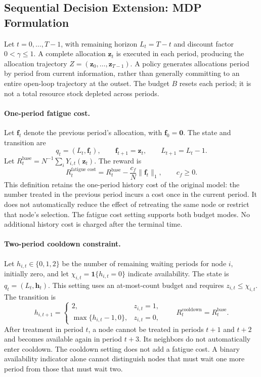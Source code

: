 \documentclass[a4paper,11pt]{article}
\newcommand{\ind}{\mathbf 1}
\numberwithin{equation}{section}
\begin{document}
\subsection{Sequential Decision Extension: MDP Formulation}
\label{sec:mdp}
Let $t=0,\ldots,T-1$, with remaining horizon $L_t=T-t$ and discount factor $0<\gamma\leq1$. A complete allocation $\mathbf z_t$ is executed in each period, producing the allocation trajectory $Z=(\mathbf z_0,\ldots,\mathbf z_{T-1})$. A policy generates allocations period by period from current information, rather than generally committing to an entire open-loop trajectory at the outset. The budget $B$ resets each period; it is not a total resource stock depleted across periods.

\paragraph{One-period fatigue cost.}
Let $\mathbf f_t$ denote the previous period's allocation, with $\mathbf f_0=\mathbf0$. The state and transition are
\begin{equation}
q_t=(L_t,\mathbf f_t),\qquad
\mathbf f_{t+1}=\mathbf z_t,\qquad L_{t+1}=L_t-1.
\end{equation}
Let $R_t^{\mathrm{base}}=N^{-1}\sum_iY_{i,t}(\mathbf z_t)$. The reward is
\begin{equation}
R_t^{\text{fatigue cost}}=R_t^{\mathrm{base}}-\frac{c_f}{N}\|\mathbf f_t\|_1,\qquad c_f\geq0.
\label{eq:fatigue-cost}
\end{equation}
This definition retains the one-period history cost of the original model: the number treated in the previous period incurs a cost once in the current period. It does not automatically reduce the effect of retreating the same node or restrict that node's selection. The fatigue cost setting supports both budget modes. No additional history cost is charged after the terminal time.

\paragraph{Two-period cooldown constraint.}
Let $h_{i,t}\in\{0,1,2\}$ be the number of remaining waiting periods for node $i$, initially zero, and let $\chi_{i,t}=\ind\{h_{i,t}=0\}$ indicate availability. The state is $q_t=(L_t,\mathbf h_t)$. This setting uses an at-most-count budget and requires $z_{i,t}\leq\chi_{i,t}$. The transition is
\begin{equation}
h_{i,t+1}=\begin{cases}
2,&z_{i,t}=1,\\
\max\{h_{i,t}-1,0\},&z_{i,t}=0,
\end{cases}
\qquad R_t^{\text{cooldown}}=R_t^{\mathrm{base}}.
\label{eq:cooldown}
\end{equation}
After treatment in period $t$, a node cannot be treated in periods $t+1$ and $t+2$ and becomes available again in period $t+3$. Its neighbors do not automatically enter cooldown. The cooldown setting does not add a fatigue cost. A binary availability indicator alone cannot distinguish nodes that must wait one more period from those that must wait two.
\end{document}
